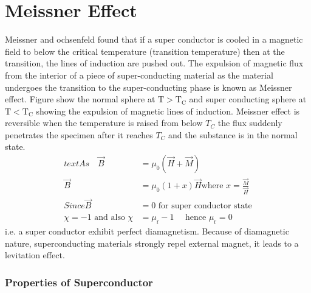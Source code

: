 \section{Meissner Effect}
Meissner and ochsenfeld found that if a super conductor is cooled in a magnetic field to below the critical temperature (transition temperature) then at the transition, the lines of induction are pushed out. The expulsion of magnetic flux from the interior of a piece of super-conducting material as the material undergoes the transition to the super-conducting phase is known as Meissner effect. Figure show the normal sphere at $\mathrm{T}>\mathrm{T}_{\mathrm{C}}$ and super conducting sphere at $\mathrm{T}<\mathrm{T}_{\mathrm{C}}$ showing the expulsion of magnetic lines of induction. Meissner effect is reversible when the temperature is raised from below $T_{C}$ the flux suddenly penetrates the specimen after it reaches $T_{C}$ and the substance is in the normal state.
\begin{align*}
text{As }\quad 
\vec{B}&=\mu_{0}(\vec{H}+\vec{M})\\
\vec{B}&=\mu_{0}(1+x) \vec{H}
\text{where }x=\frac{\vec{M}}{\vec{H}}\\
Since
\vec{B}&=0\text{ for super conductor state}\\
\chi=-1 \text { and also } \chi&=\mu_{\mathrm{r}}-1\quad \text { hence } \mu_{\mathrm{r}}=0
\end{align*}
i.e. a super conductor exhibit perfect diamagnetism. Because of diamagnetic nature, superconducting materials strongly repel external magnet, it leads to a levitation effect.
\subsubsection{Properties of Superconductor}
